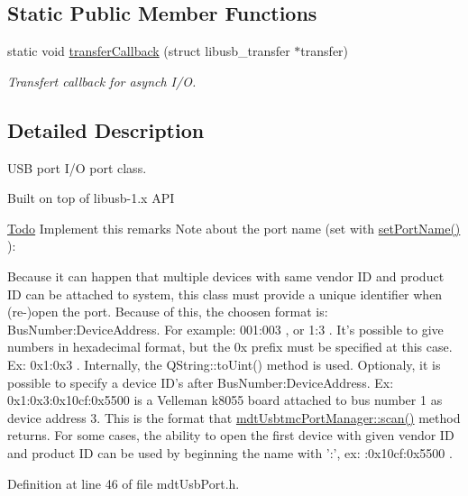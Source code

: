 \subsection*{Static Public Member Functions}
\begin{DoxyCompactItemize}
\item 
static void \hyperlink{classmdt_usb_port_ab1d37a64b7b4e471b4b9790e3c25d853}{transferCallback} (struct libusb\_\-transfer $\ast$transfer)
\begin{DoxyCompactList}\small\item\em Transfert callback for asynch I/O. \end{DoxyCompactList}\end{DoxyCompactItemize}


\subsection{Detailed Description}
USB port I/O port class. 

Built on top of libusb-\/1.x API

\begin{Desc}
\item[\hyperlink{todo__todo000020}{Todo}]Implement this remarks Note about the port name (set with \hyperlink{classmdt_abstract_port_a0ca143d32fc677bac7c1cf0e04144932}{setPortName()} ):\par
 Because it can happen that multiple devices with same vendor ID and product ID can be attached to system, this class must provide a unique identifier when (re-\/)open the port. Because of this, the choosen format is: BusNumber:DeviceAddress. For example: 001:003 , or 1:3 . It's possible to give numbers in hexadecimal format, but the 0x prefix must be specified at this case. Ex: 0x1:0x3 . Internally, the QString::toUint() method is used. Optionaly, it is possible to specify a device ID's after BusNumber:DeviceAddress. Ex: 0x1:0x3:0x10cf:0x5500 is a Velleman k8055 board attached to bus number 1 as device address 3. This is the format that \hyperlink{classmdt_port_manager_aceb9b570a2ebf354e347b8d9b46f6927}{mdtUsbtmcPortManager::scan()} method returns. For some cases, the ability to open the first device with given vendor ID and product ID can be used by beginning the name with ':', ex: :0x10cf:0x5500 . \end{Desc}


Definition at line 46 of file mdtUsbPort.h.



